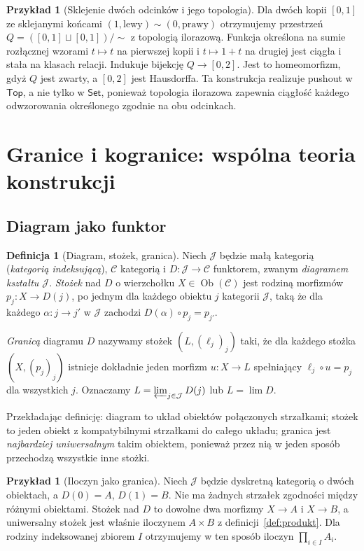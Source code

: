 \documentclass[11pt,a4paper]{article}
\numberwithin{equation}{section}
\theoremstyle{plain}
\theoremstyle{definition}
\newtheorem{definicja}[twierdzenie]{Definicja}
\newtheorem{przyklad}[twierdzenie]{Przykład}
\theoremstyle{remark}
\newcommand{\cat}[1]{\mathsf{#1}}
\newcommand{\Set}{\cat{Set}}
\newcommand{\Top}{\cat{Top}}
\newcommand{\Ob}{\operatorname{Ob}}
\begin{document}
\begin{przyklad}[Sklejenie dwóch odcinków i jego topologia]
Dla dwóch kopii $[0,1]$ ze sklejanymi końcami $(1,\mathrm{lewy})\sim(0,\mathrm{prawy})$ otrzymujemy przestrzeń $Q=([0,1]\sqcup[0,1])/{\sim}$ z topologią ilorazową. Funkcja określona na sumie rozłącznej wzorami $t\mapsto t$ na pierwszej kopii i $t\mapsto1+t$ na drugiej jest ciągła i stała na klasach relacji. Indukuje bijekcję $Q\to[0,2]$. Jest to homeomorfizm, gdyż $Q$ jest zwarty, a $[0,2]$ jest Hausdorffa. Ta konstrukcja realizuje pushout w $\Top$, a nie tylko w $\Set$, ponieważ topologia ilorazowa zapewnia ciągłość każdego odwzorowania określonego zgodnie na obu odcinkach.
\end{przyklad}


\section{Granice i kogranice: wspólna teoria konstrukcji}\label{sec:granice}

\subsection{Diagram jako funktor}

\begin{definicja}[Diagram, stożek, granica]\label{def:limit}
Niech $\mathcal J$ będzie małą kategorią (\emph{kategorią indeksującą}), $\mathcal C$ kategorią i $D:\mathcal J\to\mathcal C$ funktorem, zwanym \emph{diagramem kształtu $\mathcal J$}. \emph{Stożek} nad $D$ o wierzchołku $X\in\Ob(\mathcal C)$ jest rodziną morfizmów $p_j:X\to D(j)$, po jednym dla każdego obiektu $j$ kategorii $\mathcal J$, taką że dla każdego $\alpha:j\to j'$ w $\mathcal J$ zachodzi $D(\alpha)\circ p_j=p_{j'}$.

\emph{Granicą} diagramu $D$ nazywamy stożek $(L,(\ell_j)_j)$ taki, że dla każdego stożka $(X,(p_j)_j)$ istnieje dokładnie jeden morfizm $u:X\to L$ spełniający $\ell_j\circ u=p_j$ dla wszystkich $j$. Oznaczamy $L=\varprojlim_{j\in\mathcal J}D(j)$ lub $L=\lim D$.
\end{definicja}

Przekładając definicję: diagram to układ obiektów połączonych strzałkami; stożek to jeden obiekt z kompatybilnymi strzałkami do całego układu; granica jest \emph{najbardziej uniwersalnym} takim obiektem, ponieważ przez nią w jeden sposób przechodzą wszystkie inne stożki.

\begin{przyklad}[Iloczyn jako granica]
Niech $\mathcal J$ będzie dyskretną kategorią o dwóch obiektach, a $D(0)=A$, $D(1)=B$. Nie ma żadnych strzałek zgodności między różnymi obiektami. Stożek nad $D$ to dowolne dwa morfizmy $X\to A$ i $X\to B$, a uniwersalny stożek jest właśnie iloczynem $A\times B$ z definicji~\ref{def:produkt}. Dla rodziny indeksowanej zbiorem $I$ otrzymujemy w ten sposób iloczyn $\prod_{i\in I}A_i$.
\end{przyklad}
\end{document}
